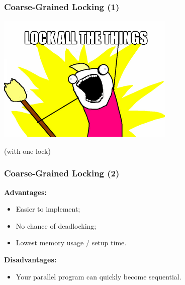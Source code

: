 \documentclass[aspectratio=43]{beamer}
\newenvironment{changemargin}[1]{%
  \begin{list}{}{%
    \setlength{\topsep}{0pt}%
    \setlength{\leftmargin}{#1}%
    \setlength{\rightmargin}{1em}
    \setlength{\listparindent}{\parindent}%
    \setlength{\itemindent}{\parindent}%
    \setlength{\parsep}{\parskip}%
  }%
  \item[]}{\end{list}}
\begin{document}
\begin{frame}
  \frametitle{Coarse-Grained Locking (1)}

  \begin{center}
    \includegraphics[scale=0.5]{L21/lock-all-the-things}

    (with one lock)
  \end{center}
\end{frame}

\begin{frame}
  \frametitle{Coarse-Grained Locking (2)}

  \begin{changemargin}{1cm}
  {\bf Advantages:}
  
  \begin{itemize}
    \item Easier to implement;
    \item No chance of deadlocking;
    \item Lowest memory usage / setup time.
  \end{itemize}
  \vfill
  {\bf Disadvantages:}
  \begin{itemize}
    \item Your parallel program can quickly become sequential.
  \end{itemize}
  \end{changemargin}
\end{frame}
\end{document}
